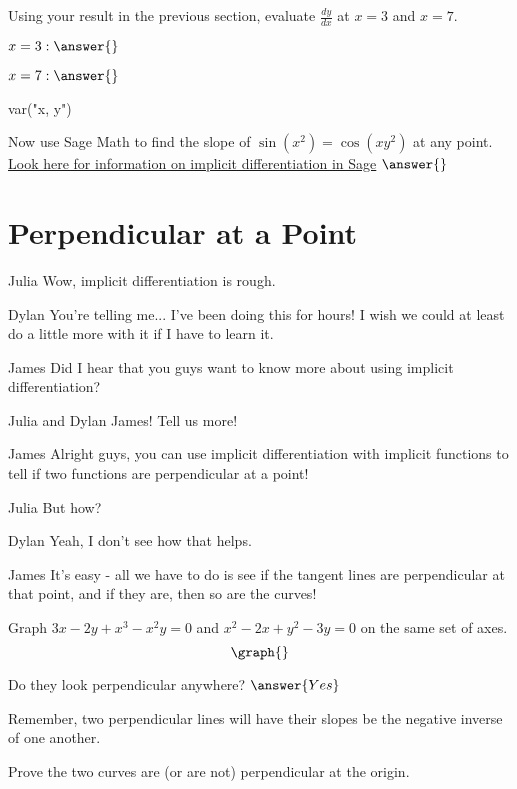 \documentclass{ximera}
\begin{document}
\begin{question}
Using your result in the previous section, evaluate $\frac{dy}{dx}$ at $x = 3$ and $x = 7$.

$x = 3: \answer{}$

$x = 7: \answer{}$
\end{question}
\begin{question}
\begin{onlineOnly}
\begin{sageCell}
var("x, y")

\end{sageCell}
\end{onlineOnly}

Now use Sage Math to find the slope of  $\sin(x^2)=\cos(xy^2)$ at any point. \href{http://doc.sagemath.org/html/en/tutorial/tour_algebra.html#differentiation-integration-etc}{Look here for information on implicit differentiation in Sage}
$\answer{}$
\end{question}
\section{Perpendicular at a Point}
\begin{dialogue}
\item[Julia] Wow, implicit differentiation is rough.
\item[Dylan] You're telling me... I've been doing this for hours! I wish we could at least do a little more with it if I have to learn it.
\item[James] Did I hear that you guys want to know more about using implicit differentiation?
\item[Julia and Dylan] James! Tell us more!
\item[James] Alright guys, you can use implicit differentiation with implicit functions to tell if two functions are perpendicular at a point!
\item[Julia] But how?
\item[Dylan] Yeah, I don't see how that helps.
\item[James] It's easy - all we have to do is see if the tangent lines are perpendicular at that point, and if they are, then so are the curves!
\end{dialogue}
\begin{question}
Graph $3x - 2y + x^3-x^2y = 0$ and $x^2 - 2x + y^2 - 3y = 0$ on the same set of axes.
\[
\graph{}
\]

Do they look perpendicular anywhere?
$\answer{Yes}$
\end{question}
\begin{question}
\begin{hint}
Remember, two perpendicular lines will have their slopes be the negative inverse of one another.
\end{hint}
Prove the two curves are (or are not) perpendicular at the origin.
\begin{freeResponse}
\end{freeResponse}
\end{question}
\end{document}

